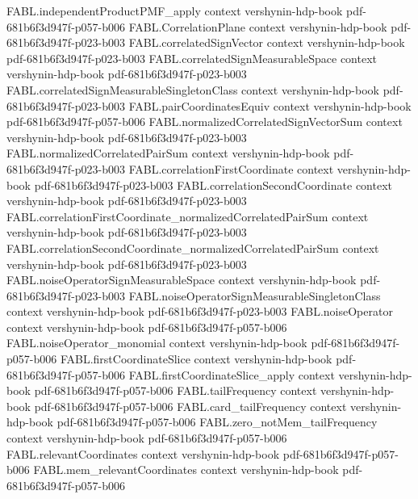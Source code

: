 \begin{theorem}
\proofstep
  {FABL.independentProductPMF_apply}
  {context}
  {vershynin-hdp-book}
  {pdf-681b6f3d947f-p057-b006}
\proofstep
  {FABL.CorrelationPlane}
  {context}
  {vershynin-hdp-book}
  {pdf-681b6f3d947f-p023-b003}
\proofstep
  {FABL.correlatedSignVector}
  {context}
  {vershynin-hdp-book}
  {pdf-681b6f3d947f-p023-b003}
\proofstep
  {FABL.correlatedSignMeasurableSpace}
  {context}
  {vershynin-hdp-book}
  {pdf-681b6f3d947f-p023-b003}
\proofstep
  {FABL.correlatedSignMeasurableSingletonClass}
  {context}
  {vershynin-hdp-book}
  {pdf-681b6f3d947f-p023-b003}
\proofstep
  {FABL.pairCoordinatesEquiv}
  {context}
  {vershynin-hdp-book}
  {pdf-681b6f3d947f-p057-b006}
\proofstep
  {FABL.normalizedCorrelatedSignVectorSum}
  {context}
  {vershynin-hdp-book}
  {pdf-681b6f3d947f-p023-b003}
\proofstep
  {FABL.normalizedCorrelatedPairSum}
  {context}
  {vershynin-hdp-book}
  {pdf-681b6f3d947f-p023-b003}
\proofstep
  {FABL.correlationFirstCoordinate}
  {context}
  {vershynin-hdp-book}
  {pdf-681b6f3d947f-p023-b003}
\proofstep
  {FABL.correlationSecondCoordinate}
  {context}
  {vershynin-hdp-book}
  {pdf-681b6f3d947f-p023-b003}
\proofstep
  {FABL.correlationFirstCoordinate_normalizedCorrelatedPairSum}
  {context}
  {vershynin-hdp-book}
  {pdf-681b6f3d947f-p023-b003}
\proofstep
  {FABL.correlationSecondCoordinate_normalizedCorrelatedPairSum}
  {context}
  {vershynin-hdp-book}
  {pdf-681b6f3d947f-p023-b003}
\proofstep
  {FABL.noiseOperatorSignMeasurableSpace}
  {context}
  {vershynin-hdp-book}
  {pdf-681b6f3d947f-p023-b003}
\proofstep
  {FABL.noiseOperatorSignMeasurableSingletonClass}
  {context}
  {vershynin-hdp-book}
  {pdf-681b6f3d947f-p023-b003}
\proofstep
  {FABL.noiseOperator}
  {context}
  {vershynin-hdp-book}
  {pdf-681b6f3d947f-p057-b006}
\proofstep
  {FABL.noiseOperator_monomial}
  {context}
  {vershynin-hdp-book}
  {pdf-681b6f3d947f-p057-b006}
\proofstep
  {FABL.firstCoordinateSlice}
  {context}
  {vershynin-hdp-book}
  {pdf-681b6f3d947f-p057-b006}
\proofstep
  {FABL.firstCoordinateSlice_apply}
  {context}
  {vershynin-hdp-book}
  {pdf-681b6f3d947f-p057-b006}
\proofstep
  {FABL.tailFrequency}
  {context}
  {vershynin-hdp-book}
  {pdf-681b6f3d947f-p057-b006}
\proofstep
  {FABL.card_tailFrequency}
  {context}
  {vershynin-hdp-book}
  {pdf-681b6f3d947f-p057-b006}
\proofstep
  {FABL.zero_notMem_tailFrequency}
  {context}
  {vershynin-hdp-book}
  {pdf-681b6f3d947f-p057-b006}
\proofstep
  {FABL.relevantCoordinates}
  {context}
  {vershynin-hdp-book}
  {pdf-681b6f3d947f-p057-b006}
\proofstep
  {FABL.mem_relevantCoordinates}
  {context}
  {vershynin-hdp-book}
  {pdf-681b6f3d947f-p057-b006}

\end{theorem}
